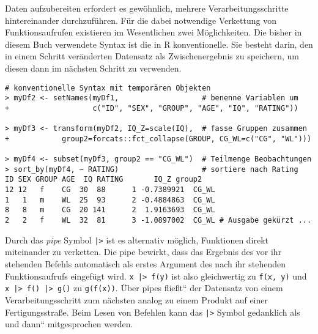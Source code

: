 Daten aufzubereiten erfordert es gewöhnlich, mehrere Verarbeitungsschritte hintereinander durchzuführen. Für die dabei notwendige Verkettung von Funktionsaufrufen existieren im Wesentlichen zwei Möglichkeiten. Die bisher in diesem Buch verwendete Syntax ist die in R konventionelle. Sie besteht darin, den in einem Schritt veränderten Datensatz als Zwischenergebnis zu speichern, um diesen dann im nächsten Schritt zu verwenden.
\begin{lstlisting}
# konventionelle Syntax mit temporären Objekten
> myDf2 <- setNames(myDf1,                   # benenne Variablen um
+                   c("ID", "SEX", "GROUP", "AGE", "IQ", "RATING"))

> myDf3 <- transform(myDf2, IQ_Z=scale(IQ),  # fasse Gruppen zusammen
+            group2=forcats::fct_collapse(GROUP, CG_WL=c("CG", "WL")))

> myDf4 <- subset(myDf3, group2 == "CG_WL")  # Teilmenge Beobachtungen
> sort_by(myDf4, ~ RATING)                   # sortiere nach Rating
ID SEX GROUP AGE  IQ RATING       IQ_Z group2
12 12   f    CG  30  88      1 -0.7389921  CG_WL
1   1   m    WL  25  93      2 -0.4884863  CG_WL
8   8   m    CG  20 141      2  1.9163693  CG_WL
2   2   f    WL  32  81      3 -1.0897002  CG_WL # Ausgabe gekürzt ...
\end{lstlisting}

Durch das \emph{pipe} Symbol \lstinline!|>! ist es alternativ möglich, Funktionen direkt miteinander zu verketten. Die pipe bewirkt, dass das Ergebnis des vor ihr stehenden Befehls automatisch als erstes Argument des nach ihr stehenden Funktionsaufrufs eingefügt wird. \lstinline!x |> f(y)! ist also gleichwertig zu \lstinline!f(x, y)! und \lstinline!x |> f() |> g()! zu \lstinline!g(f(x))!. Über pipes {\quotedblbase}fließt{\textquotedblleft} der Datensatz von einem Verarbeitungsschritt zum nächsten analog zu einem Produkt auf einer Fertigungsstraße. Beim Lesen von Befehlen kann das \lstinline!|>! Symbol gedanklich als {\quotedblbase}und dann{\textquotedblleft} mitgesprochen werden.

